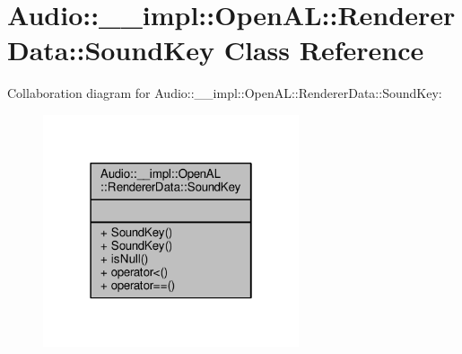 \hypertarget{classAudio_1_1____impl_1_1OpenAL_1_1RendererData_1_1SoundKey}{}\section{Audio\+:\+:\+\_\+\+\_\+impl\+:\+:Open\+AL\+:\+:Renderer\+Data\+:\+:Sound\+Key Class Reference}
\label{classAudio_1_1____impl_1_1OpenAL_1_1RendererData_1_1SoundKey}


Collaboration diagram for Audio\+:\+:\+\_\+\+\_\+impl\+:\+:Open\+AL\+:\+:Renderer\+Data\+:\+:Sound\+Key\+:
\nopagebreak
\begin{figure}[H]
\begin{center}
\leavevmode
\includegraphics[width=214pt]{d6/d45/classAudio_1_1____impl_1_1OpenAL_1_1RendererData_1_1SoundKey__coll__graph}
\end{center}
\end{figure}
